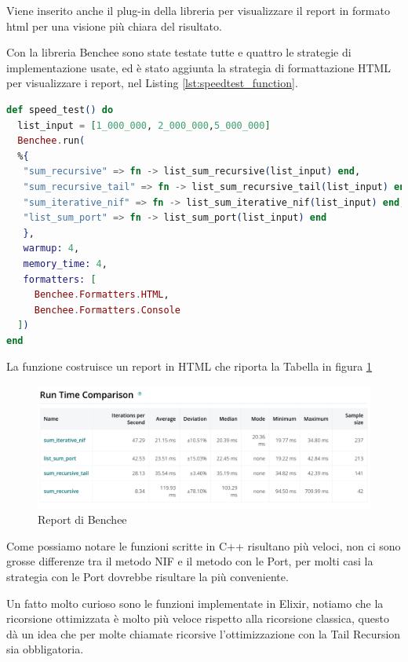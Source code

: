 Viene inserito anche il plug-in della libreria
per visualizzare il report in formato html per
una visione più chiara del risultato.

Con la libreria Benchee sono state testate tutte e quattro le
strategie di implementazione usate, ed è stato aggiunta la strategia
di formattazione HTML per visualizzare i report, nel Listing \ref{lst:speedtest_function}.
 

\begin{lstlisting}[language=elixir,captionpos=b,
	caption={Funzione speed\_test()},
	label={lst:speedtest_function}]
def speed_test() do
  list_input = [1_000_000, 2_000_000,5_000_000]
  Benchee.run(
  %{
   "sum_recursive" => fn -> list_sum_recursive(list_input) end,
   "sum_recursive_tail" => fn -> list_sum_recursive_tail(list_input) end,
   "sum_iterative_nif" => fn -> list_sum_iterative_nif(list_input) end,
   "list_sum_port" => fn -> list_sum_port(list_input) end
   },
   warmup: 4,
   memory_time: 4,
   formatters: [
     Benchee.Formatters.HTML,
     Benchee.Formatters.Console
  ])
end
\end{lstlisting}

La funzione costruisce un report in HTML che riporta la Tabella
in figura \ref{fig:report_tab_interoperabilita}

\begin{figure}[!htp]
    \centering
    \includegraphics[keepaspectratio=true,scale=0.21]{images/tab_report.png}
	\caption{Report di Benchee}
  	\label{fig:report_tab_interoperabilita}
\end{figure}

Come possiamo notare le funzioni scritte in C++ risultano più veloci,
non ci sono grosse differenze tra il metodo NIF e il metodo con le Port,
per molti casi la strategia con le Port dovrebbe risultare la più conveniente.

Un fatto molto curioso sono le funzioni implementate in Elixir,
notiamo che la ricorsione ottimizzata è molto più veloce rispetto
alla ricorsione classica, questo dà un idea che per molte chiamate ricorsive
l'ottimizzazione con la Tail Recursion sia obbligatoria.
